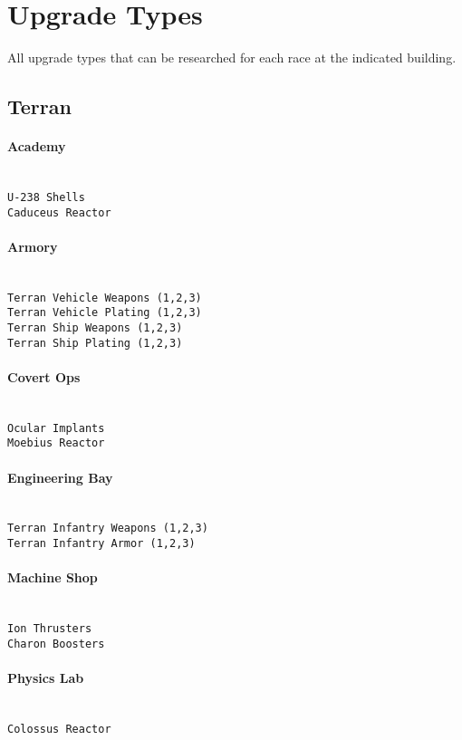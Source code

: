 \section{Upgrade Types}
\label{upgradetype}
All upgrade types that can be researched for each race at the indicated building.

\subsection{Terran}

\paragraph{Academy} \mbox{}\\
\verb|U-238 Shells| \\
\verb|Caduceus Reactor|

\paragraph{Armory} \mbox{}\\
\verb|Terran Vehicle Weapons (1,2,3)|\\
\verb|Terran Vehicle Plating (1,2,3)|\\
\verb|Terran Ship Weapons (1,2,3)|\\
\verb|Terran Ship Plating (1,2,3)|

\paragraph{Covert Ops} \mbox{}\\
\verb|Ocular Implants|\\
\verb|Moebius Reactor|

\paragraph{Engineering Bay} \mbox{}\\
\verb|Terran Infantry Weapons (1,2,3)|\\
\verb|Terran Infantry Armor (1,2,3)|

\paragraph{Machine Shop} \mbox{}\\
\verb|Ion Thrusters|\\
\verb|Charon Boosters|

\paragraph{Physics Lab} \mbox{}\\
\verb|Colossus Reactor|

